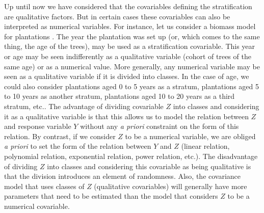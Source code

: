 Up until now we have considered that the covariables defining the stratification are qualitative factors. But in certain cases these covariables can also be interpreted as numerical variables. For instance, let us consider a biomass model for plantations \citep{saintandre05}. The year the plantation was set up (or, which comes to the same thing, the age of the trees), may be used as a stratification covariable. This year or age may be seen indifferently as a qualitative variable (cohort of trees of the same age) or as a numerical value. More generally, any numerical variable may be seen as a qualitative variable if it is divided into classes. In the case of age, we could also consider plantations aged 0 to 5 years as a stratum, plantations aged 5 to 10 years as another stratum, plantations aged 10 to 20 years as a third stratum, etc.. The advantage of dividing covariable $Z$ into classes and considering it as a qualitative variable is that this allows us to model the relation between $Z$ and response variable $Y$ without any \textit{a priori} constraint on the form of this relation. By contrast, if we consider $Z$ to be a numerical variable, we are obliged \textit{a priori} to set the form of the relation between $Y$ and $Z$ (linear relation, polynomial relation, exponential relation, power relation, etc.). The disadvantage of dividing $Z$ into classes and considering this covariable as being qualitative is that the division introduces an element of randomness. Also, the covariance model that uses classes of $Z$ (qualitative covariables) will generally have more parameters that need to be estimated than the model that considers $Z$ to be a numerical covariable.

